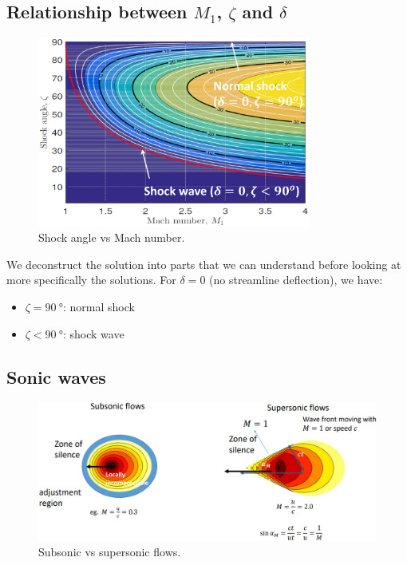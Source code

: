 \documentclass[class=report, crop=false, 12pt,a4paper]{standalone}
\begin{document}
\subsection{Relationship between $M_1$, $\zeta$ and $\delta$}
\begin{figure}[H]
    \centering
    \includegraphics[width = 0.8\textwidth]{../img/hd/diagram3.png}
    \caption{Shock angle vs Mach number.}
\end{figure}
We deconstruct the solution into parts that we can understand before looking at more specifically the solutions. For $\delta = 0$ (no streamline deflection), we have:
\begin{itemize}
    \item $\zeta = \SI{90}{\degree}$: normal shock
    \item $\zeta < \SI{90}{\degree}$: shock wave
\end{itemize}
\subsection{Sonic waves}
\begin{figure}[H]
    \centering
    \includegraphics[width = \textwidth]{../img/hd/diagram4.png}
    \caption{Subsonic vs supersonic flows.}
\end{figure}
\end{document}
